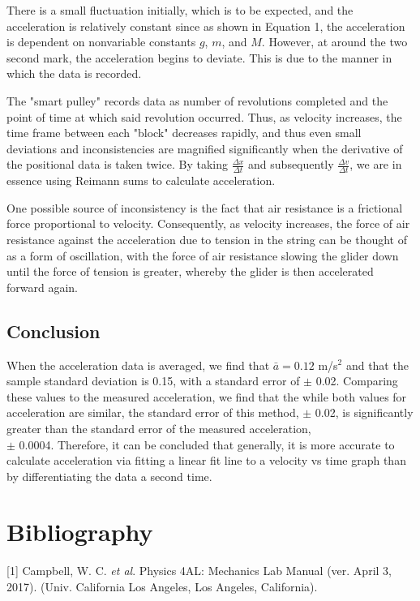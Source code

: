 \documentclass[titlepage]{article}
\begin{document}
There is a small fluctuation initially, which is to be expected, and the acceleration is relatively constant since as shown in Equation 1, the acceleration is dependent on nonvariable constants $g$, $m$, and $M$. However, at around the two second mark, the acceleration begins to deviate. This is due to the manner in which the data is recorded.

The "smart pulley" records data as number of revolutions completed and the point of time at which said revolution occurred. Thus, as velocity increases, the time frame between each "block" decreases rapidly, and thus even small deviations and inconsistencies are magnified significantly when the derivative of the positional data is taken twice. By taking $\frac{\Delta x}{\Delta t}$ and subsequently $\frac{\Delta v}{\Delta t}$, we are in essence using Reimann sums to calculate acceleration.

One possible source of inconsistency is the fact that air resistance is a frictional force proportional to velocity. Consequently, as velocity increases, the force of air resistance against the acceleration due to tension in the string can be thought of as a form of oscillation, with the force of air resistance slowing the glider down until the force of tension is greater, whereby the glider is then accelerated forward again.

\subsection{Conclusion}
When the acceleration data is averaged, we find that $\bar a = 0.12$ m/s$^2$ and that the sample standard deviation is 0.15, with a standard error of $\pm$ 0.02. Comparing these values to the measured acceleration, we find that the while both values for acceleration are similar, the standard error of this method,  $\pm$ 0.02, is significantly greater than the standard error of the measured acceleration, \\ $\pm$ 0.0004. Therefore, it can be concluded that generally, it is more accurate to calculate acceleration via fitting a linear fit line to a velocity vs time graph than by differentiating the data a second time.

\pagebreak

\section{Bibliography}

[1] Campbell, W. C. \textit{et al}. Physics 4AL: Mechanics Lab Manual (ver. April 3, 2017).
(Univ. California Los Angeles, Los Angeles, California).
\end{document}
